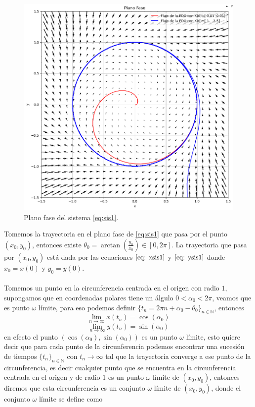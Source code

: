 \documentclass[12pt, a4paper]{report}
\begin{document}
\begin{figure}[h]
	\centering
	\includegraphics[width=13cm]{planofase1.png}
	\caption{Plano fase del sistema \eqref{eq:sis1}.}
\end{figure}

Tomemos la trayectoria en el plano fase de \eqref{eq:sis1} que pasa por el punto
$(x_0,y_0)$, entonces existe $\theta_0=\arctan(\frac{y_0}{x_0})\in[0,2\pi]$.
La trayectoria que pasa por $(x_0,y_0)$ está dada por las ecuaciones $\eqref{eq: xsis1}$ y
$\eqref{eq: ysis1}$ donde $x_0=x(0)$ y $y_0=y(0)$.\\
\\Tomemos un punto en la circunferencia centrada en el origen con radio $1$,
supongamos que
en coordenadas polares tiene un álgulo $0<\alpha_0<2\pi$, veamos que es punto $\omega$ límite, para eso podemos definir
$\{t_n=2\pi n+\alpha_0-\theta_0\}_{n\in \mathbb{N}}$, entonces
$$\lim_{n\to\infty}x(t_n)=\cos(\alpha_0)$$
$$\lim_{n\to\infty}y(t_n)=\sin(\alpha_0)$$
en efecto el punto $(\cos(\alpha_0),\sin(\alpha_0))$ es un punto $\omega$ límite, esto
quiere decir que para cada punto de la circunferencia podemos encontrar
una sucesión de tiempos $\{t_n\}_{n\in \mathbb{N}}$ con $t_n\to\infty$ tal que la
trayectoria converge a ese punto de la circunferencia, es decir cualquier punto que se encuentra en la
circunferencia centrada en el origen y de radio $1$ es un punto $\omega$ límite de $(x_0,y_0)$,
entonces diremos que esta circunferencia es un conjunto $\omega$ límite de $(x_0,y_0)$, donde
el conjunto $\omega$ límite se define como
\end{document}
